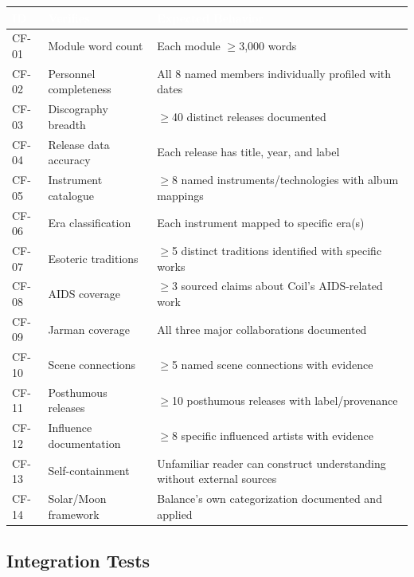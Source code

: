 \documentclass[11pt,letterpaper]{article}
\newcommand{\tableheader}[1]{\textbf{\sffamily\textcolor{white}{#1}}}
\begin{document}
\begin{center}
\begin{tabularx}{\textwidth}{C{1.2cm}L{3.5cm}X}
\toprule
{}
\tableheader{ID} & \tableheader{Verifies} & \tableheader{Expected Behavior} \\
\midrule
CF-01 & Module word count & Each module $\geq$3,000 words \\
CF-02 & Personnel completeness & All 8 named members individually profiled with dates \\
CF-03 & Discography breadth & $\geq$40 distinct releases documented \\
CF-04 & Release data accuracy & Each release has title, year, and label \\
CF-05 & Instrument catalogue & $\geq$8 named instruments/technologies with album mappings \\
CF-06 & Era classification & Each instrument mapped to specific era(s) \\
CF-07 & Esoteric traditions & $\geq$5 distinct traditions identified with specific works \\
CF-08 & AIDS coverage & $\geq$3 sourced claims about Coil's AIDS-related work \\
CF-09 & Jarman coverage & All three major collaborations documented \\
CF-10 & Scene connections & $\geq$5 named scene connections with evidence \\
CF-11 & Posthumous releases & $\geq$10 posthumous releases with label/provenance \\
CF-12 & Influence documentation & $\geq$8 specific influenced artists with evidence \\
CF-13 & Self-containment & Unfamiliar reader can construct understanding without external sources \\
CF-14 & Solar/Moon framework & Balance's own categorization documented and applied \\
\bottomrule
\end{tabularx}
\end{center}

\subsection{Integration Tests}
\end{document}

